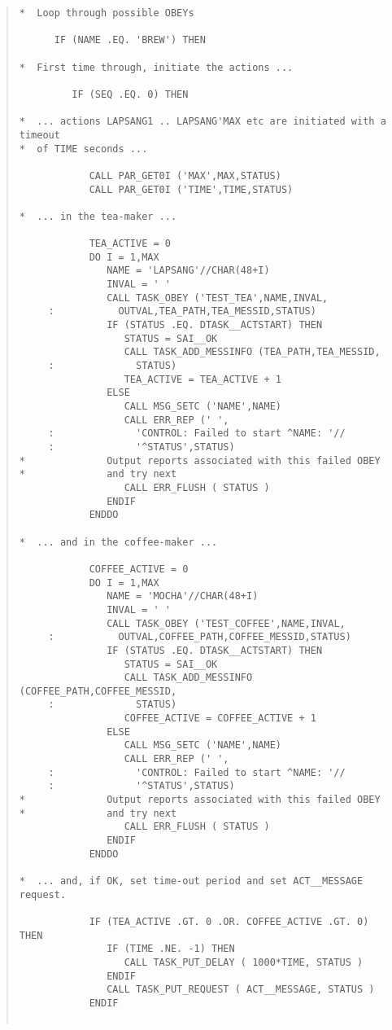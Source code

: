 \documentclass[twoside,11pt]{article}
\renewcommand{\_}{\texttt{\symbol{95}}}
\begin{document}
\begin{quote}
\begin{verbatim}
*  Loop through possible OBEYs

      IF (NAME .EQ. 'BREW') THEN

*  First time through, initiate the actions ...

         IF (SEQ .EQ. 0) THEN

*  ... actions LAPSANG1 .. LAPSANG'MAX etc are initiated with a timeout
*  of TIME seconds ...

            CALL PAR_GET0I ('MAX',MAX,STATUS)
            CALL PAR_GET0I ('TIME',TIME,STATUS)

*  ... in the tea-maker ...

            TEA_ACTIVE = 0
            DO I = 1,MAX
               NAME = 'LAPSANG'//CHAR(48+I)
               INVAL = ' '
               CALL TASK_OBEY ('TEST_TEA',NAME,INVAL,
     :           OUTVAL,TEA_PATH,TEA_MESSID,STATUS)
               IF (STATUS .EQ. DTASK__ACTSTART) THEN
                  STATUS = SAI__OK
                  CALL TASK_ADD_MESSINFO (TEA_PATH,TEA_MESSID,
     :              STATUS)
                  TEA_ACTIVE = TEA_ACTIVE + 1
               ELSE
                  CALL MSG_SETC ('NAME',NAME)
                  CALL ERR_REP (' ',
     :              'CONTROL: Failed to start ^NAME: '//
     :              '^STATUS',STATUS)
*              Output reports associated with this failed OBEY
*              and try next
                  CALL ERR_FLUSH ( STATUS )
               ENDIF
            ENDDO

*  ... and in the coffee-maker ...

            COFFEE_ACTIVE = 0
            DO I = 1,MAX
               NAME = 'MOCHA'//CHAR(48+I)
               INVAL = ' '
               CALL TASK_OBEY ('TEST_COFFEE',NAME,INVAL,
     :           OUTVAL,COFFEE_PATH,COFFEE_MESSID,STATUS)
               IF (STATUS .EQ. DTASK__ACTSTART) THEN
                  STATUS = SAI__OK
                  CALL TASK_ADD_MESSINFO (COFFEE_PATH,COFFEE_MESSID,
     :              STATUS)
                  COFFEE_ACTIVE = COFFEE_ACTIVE + 1
               ELSE
                  CALL MSG_SETC ('NAME',NAME)
                  CALL ERR_REP (' ',
     :              'CONTROL: Failed to start ^NAME: '//
     :              '^STATUS',STATUS)
*              Output reports associated with this failed OBEY
*              and try next
                  CALL ERR_FLUSH ( STATUS )
               ENDIF
            ENDDO

*  ... and, if OK, set time-out period and set ACT__MESSAGE request.

            IF (TEA_ACTIVE .GT. 0 .OR. COFFEE_ACTIVE .GT. 0) THEN
               IF (TIME .NE. -1) THEN
                  CALL TASK_PUT_DELAY ( 1000*TIME, STATUS )
               ENDIF
               CALL TASK_PUT_REQUEST ( ACT__MESSAGE, STATUS )
            ENDIF


\end{verbatim}
\end{quote}
\end{document}
